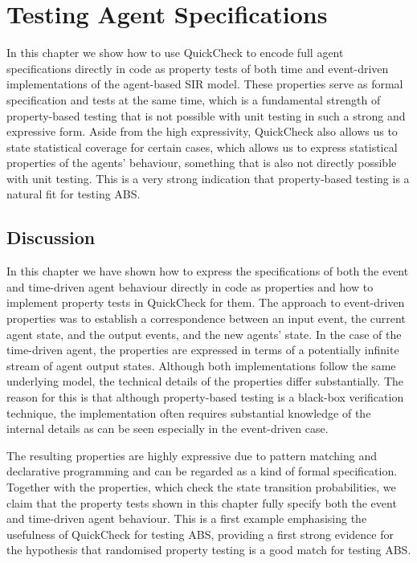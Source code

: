 \chapter{Testing Agent Specifications}
\label{ch:agentspec}

In this chapter we show how to use QuickCheck to encode full agent specifications directly in code as property tests of both time and event-driven implementations of the agent-based SIR model. These properties serve as formal specification and tests at the same time, which is a fundamental strength of property-based testing that is not possible with unit testing in such a strong and expressive form. Aside from the high expressivity, QuickCheck also allows us to state statistical coverage for certain cases, which allows us to express statistical properties of the agents' behaviour, something that is also not directly possible with unit testing. This is a very strong indication that property-based testing is a natural fit for testing ABS.





\section{Discussion}
In this chapter we have shown how to express the specifications of both the event and time-driven agent behaviour directly in code as properties and how to implement property tests in QuickCheck for them. The approach to event-driven properties was to establish a correspondence between an input event, the current agent state, and the output events, and the new agents' state. In the case of the time-driven agent, the properties are expressed in terms of a potentially infinite stream of agent output states. Although both implementations follow the same underlying model, the technical details of the properties differ substantially. The reason for this is that although property-based testing is a black-box verification technique, the implementation often requires substantial knowledge of the internal details as can be seen especially in the event-driven case.

The resulting properties are highly expressive due to pattern matching and declarative programming and can be regarded as a kind of formal specification. Together with the properties, which check the state transition probabilities, we claim that the property tests shown in this chapter fully specify both the event and time-driven agent behaviour. This is a first example emphasising the usefulness of QuickCheck for testing ABS, providing a first strong evidence for the hypothesis that randomised property testing is a good match for testing ABS.

